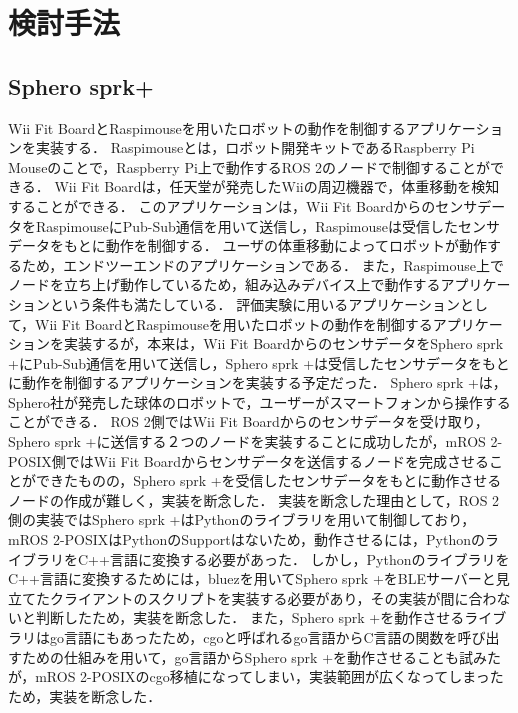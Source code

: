 \chapter{検討手法}

\section{Sphero sprk+}
Wii Fit BoardとRaspimouseを用いたロボットの動作を制御するアプリケーションを実装する．
Raspimouseとは，ロボット開発キットであるRaspberry Pi Mouseのことで，Raspberry Pi上で動作するROS 2のノードで制御することができる．
Wii Fit Boardは，任天堂が発売したWiiの周辺機器で，体重移動を検知することができる．
このアプリケーションは，Wii Fit BoardからのセンサデータをRaspimouseにPub-Sub通信を用いて送信し，Raspimouseは受信したセンサデータをもとに動作を制御する．
ユーザの体重移動によってロボットが動作するため，エンドツーエンドのアプリケーションである．
また，Raspimouse上でノードを立ち上げ動作しているため，組み込みデバイス上で動作するアプリケーションという条件も満たしている．
評価実験に用いるアプリケーションとして，Wii Fit BoardとRaspimouseを用いたロボットの動作を制御するアプリケーションを実装するが，本来は，Wii Fit BoardからのセンサデータをSphero sprk +にPub-Sub通信を用いて送信し，Sphero sprk +は受信したセンサデータをもとに動作を制御するアプリケーションを実装する予定だった．
Sphero sprk +は，Sphero社が発売した球体のロボットで，ユーザーがスマートフォンから操作することができる．
ROS 2側ではWii Fit Boardからのセンサデータを受け取り，Sphero sprk +に送信する２つのノードを実装することに成功したが，mROS 2-POSIX側ではWii Fit Boardからセンサデータを送信するノードを完成させることができたものの，Sphero sprk +を受信したセンサデータをもとに動作させるノードの作成が難しく，実装を断念した．
実装を断念した理由として，ROS 2側の実装ではSphero sprk +はPythonのライブラリを用いて制御しており，mROS 2-POSIXはPythonのSupportはないため，動作させるには，PythonのライブラリをC++言語に変換する必要があった．
しかし，PythonのライブラリをC++言語に変換するためには，bluezを用いてSphero sprk +をBLEサーバーと見立てたクライアントのスクリプトを実装する必要があり，その実装が間に合わないと判断したため，実装を断念した．
また，Sphero sprk +を動作させるライブラリはgo言語にもあったため，cgoと呼ばれるgo言語からC言語の関数を呼び出すための仕組みを用いて，go言語からSphero sprk +を動作させることも試みたが，mROS 2-POSIXのcgo移植になってしまい，実装範囲が広くなってしまったため，実装を断念した．

